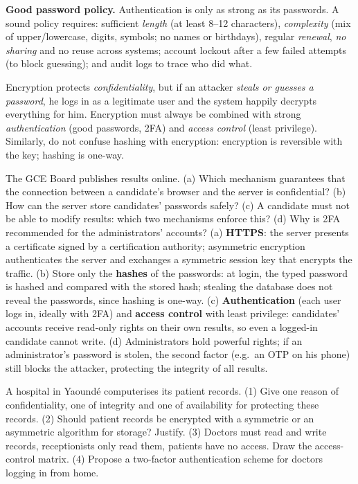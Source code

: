 \documentclass[11pt]{article}
\newcommand{\cle}[1]{{\popxbold\color{popdark}#1}}
\begin{document}
\textbf{Good password policy.} Authentication is only as strong as its passwords. A sound policy requires: sufficient \emph{length} (at least 8--12 characters), \emph{complexity} (mix of upper/lowercase, digits, symbols; no names or birthdays), regular \emph{renewal}, \emph{no sharing} and no reuse across systems; \cle{account lockout} after a few failed attempts (to block guessing); and \cle{audit logs} to trace who did what.

\begin{attention}
Encryption protects \emph{confidentiality}, but if an attacker \emph{steals or guesses a password}, he logs in as a legitimate user and the system happily decrypts everything for him. Encryption must always be combined with strong \emph{authentication} (good passwords, 2FA) and \emph{access control} (least privilege). Similarly, do not confuse hashing with encryption: encryption is reversible with the key; hashing is one-way.
\end{attention}

\begin{exoresolu}
The GCE Board publishes results online. (a) Which mechanism guarantees that the connection between a candidate's browser and the server is confidential? (b) How can the server store candidates' passwords safely? (c) A candidate must not be able to modify results: which two mechanisms enforce this? (d) Why is 2FA recommended for the administrators' accounts?
\tcblower
(a) \textbf{HTTPS}: the server presents a certificate signed by a certification authority; asymmetric encryption authenticates the server and exchanges a symmetric session key that encrypts the traffic. (b) Store only the \textbf{hashes} of the passwords: at login, the typed password is hashed and compared with the stored hash; stealing the database does not reveal the passwords, since hashing is one-way. (c) \textbf{Authentication} (each user logs in, ideally with 2FA) and \textbf{access control} with least privilege: candidates' accounts receive read-only rights on their own results, so even a logged-in candidate cannot write. (d) Administrators hold powerful rights; if an administrator's password is stolen, the second factor (e.g.\ an OTP on his phone) still blocks the attacker, protecting the integrity of all results.
\end{exoresolu}

\begin{exercice}
A hospital in Yaound\'e computerises its patient records. (1) Give one reason of confidentiality, one of integrity and one of availability for protecting these records. (2) Should patient records be encrypted with a symmetric or an asymmetric algorithm for storage? Justify. (3) Doctors must read and write records, receptionists only read them, patients have no access. Draw the access-control matrix. (4) Propose a two-factor authentication scheme for doctors logging in from home.
\end{exercice}
\end{document}
